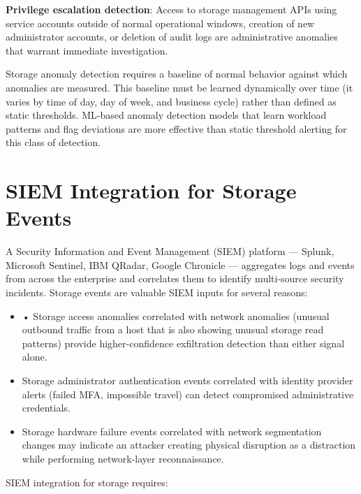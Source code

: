 \textbf{Privilege escalation detection}: Access to storage management APIs using service accounts outside of normal operational windows, creation of new administrator accounts, or deletion of audit logs are administrative anomalies that warrant immediate investigation.

Storage anomaly detection requires a baseline of normal behavior against which anomalies are measured. This baseline must be learned dynamically over time (it varies by time of day, day of week, and business cycle) rather than defined as static thresholds. ML-based anomaly detection models that learn workload patterns and flag deviations are more effective than static threshold alerting for this class of detection.

\section{SIEM Integration for Storage Events}
A Security Information and Event Management (SIEM) platform --- Splunk, Microsoft Sentinel, IBM QRadar, Google Chronicle --- aggregates logs and events from across the enterprise and correlates them to identify multi-source security incidents. Storage events are valuable SIEM inputs for several reasons:

\begin{itemize}
  \item • Storage access anomalies correlated with network anomalies (unusual outbound traffic from a host that is also showing unusual storage read patterns) provide higher-confidence exfiltration detection than either signal alone.
  \item Storage administrator authentication events correlated with identity provider alerts (failed MFA, impossible travel) can detect compromised administrative credentials.
  \item Storage hardware failure events correlated with network segmentation changes may indicate an attacker creating physical disruption as a distraction while performing network-layer reconnaissance.
\end{itemize}

SIEM integration for storage requires:

